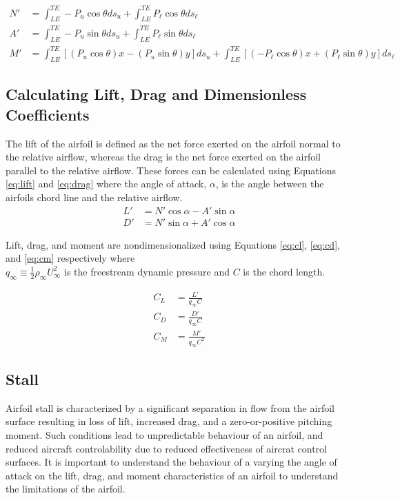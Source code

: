 \documentclass[runningheads]{llncs}
\begin{document}
\begin{align}
    N' &= \int_{LE}^{TE} -P_u\cos\theta ds_u + \int_{LE}^{TE} P_\ell\cos\theta ds_\ell
    \label{eq:normal_force}\\
    A' &= \int_{LE}^{TE} -P_u\sin\theta ds_u + \int_{LE}^{TE} P_\ell\sin\theta ds_\ell
    \label{eq:axial_force}\\
    M' &= \int_{LE}^{TE} \left[(P_u\cos\theta)x - (P_u\sin\theta)y\right]ds_u + \int_{LE}^{TE} \left[(-P_\ell\cos\theta)x + (P_\ell\sin\theta)y\right]ds_\ell
    \label{eq:leading_edge_moment}
\end{align}

\subsection{Calculating Lift, Drag and Dimensionless Coefficients}

The lift of the airfoil is defined as the net force exerted on the airfoil normal to the relative airflow, whereas the drag is the net force exerted on the airfoil parallel to the relative airflow. These forces can be calculated using Equations \ref{eq:lift} and \ref{eq:drag} where the angle of attack, $\alpha$, is the angle between the airfoils chord line and the relative airflow.
\begin{align}
    L' &= N'\cos\alpha - A'\sin\alpha \label{eq:lift} \\
    D' &= N'\sin\alpha + A'\cos\alpha \label{eq:drag}
\end{align}

Lift, drag, and moment are nondimensionalized using Equations \ref{eq:cl}, \ref{eq:cd}, and \ref{eq:cm} respectively where\\
$q_\infty\equiv\frac{1}{2}\rho_\infty U_\infty^2$ is the freestream dynamic pressure and $C$ is the chord length.

\begin{align}
    C_L &= \frac{L'}{q_\infty C}
    \label{eq:cl}\\
    C_D &= \frac{D'}{q_\infty C}
    \label{eq:cd}\\
    C_M &= \frac{M'}{q_\infty C^2}
    \label{eq:cm}
\end{align}

\subsection{Stall}
Airfoil stall is characterized by a significant separation in flow from the airfoil surface resulting in loss of lift, increased drag, and a zero-or-positive pitching moment. Such conditions lead to unpredictable behaviour of an airfoil, and reduced aircraft controlability due to reduced effectiveness of aircrat control surfaces. It is important to understand the behaviour of a varying the angle of attack on the lift, drag, and moment characteristics of an airfoil to understand the limitations of the airfoil.
\end{document}
